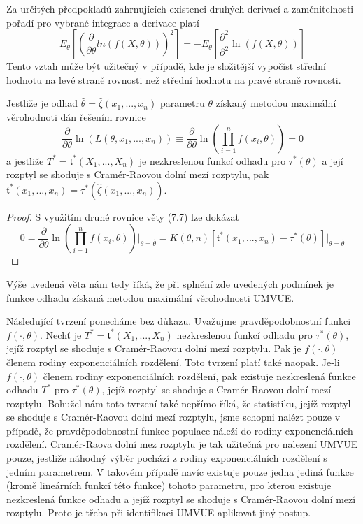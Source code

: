 Za určitých předpokladů zahrnujících existenci druhých derivací a zaměnitelnosti pořadí pro vybrané integrace a derivace platí
\begin{equation*}
E_{\theta}\left[\left(\frac{\partial}{\partial \theta} ln \left(f(X, \theta)\right)\right)^2\right] = - E_{\theta}\left[\frac{\partial^2}{\partial^2}\ln\left(f(X, \theta)\right)\right]
\end{equation*}
Tento vztah může být užitečný v případě, kde je složitější vypočíst střední hodnotu na levé straně rovnosti než střední hodnotu na pravé straně rovnosti.

\begin{theorem}
Jestliže je odhad $\hat{\theta} = \hat{\zeta}(x_1, ..., x_n)$ parametru $\theta$ získaný metodou maximální věrohodnoti dán řešením rovnice
\begin{equation*}
\frac{\partial}{\partial \theta}\ln\left(L(\theta, x_1, ..., x_n)\right) \equiv \frac{\partial}{\partial \theta}\ln \left(\prod_{i = 1}^n f(x_i, \theta) \right) = 0
\end{equation*}
a jestliže $T^* = \mathfrak{t}^*(X_1, ..., X_n)$ je nezkreslenou funkcí odhadu pro $\tau^*(\theta)$ a její rozptyl se shoduje s Cramér-Raovou dolní mezí rozptylu, pak $\mathfrak{t}^*(x_1, ..., x_n) = \tau^*(\hat{\zeta}(x_1, ..., x_n))$.
\end{theorem}

\begin{proof}
S využitím druhé rovnice věty (7.7) lze dokázat
\begin{equation*}
0 = \frac{\partial}{\partial \theta}\ln \left(\prod_{i = 1}^n f(x_i, \theta)\right)\Big|_{\theta = \hat{\theta}} = K(\theta, n)[\mathfrak{t}^*(x_1, ..., x_n) - \tau^*(\theta)]\Big|_{\theta = \hat{\theta}}
\end{equation*}
\end{proof}

Výše uvedená věta nám tedy říká, že při splnění zde uvedených podmínek je funkce odhadu získaná metodou maximální věrohodnosti UMVUE.

Následující tvrzení ponecháme bez důkazu. Uvažujme pravděpodobnostní funkci $f(\cdot, \theta)$. Nechť je $T^* = \mathfrak{t}^*(X_1, ..., X_n)$ nezkreslenou funkcí odhadu pro $\tau^*(\theta)$, jejíž rozptyl se shoduje s Cramér-Raovou dolní mezí rozptylu. Pak je $f(\cdot, \theta)$ členem rodiny exponenciálních rozdělení. Toto tvrzení platí také naopak. Je-li $f(\cdot, \theta)$ členem rodiny exponenciálních rozdělení, pak existuje nezkreslená funkce odhadu $T^*$ pro $\tau^*(\theta)$, jejíž rozptyl se shoduje s Cramér-Raovou dolní mezí rozptylu. Bohužel nám toto tvrzení také nepřímo říká, že statistiku, jejíž rozptyl se shoduje s Cramér-Raovou dolní mezí rozptylu, jsme schopni nalézt pouze v případě, že pravděpodobnostní funkce populace náleží do rodiny exponenciálních rozdělení. Cramér-Raova dolní mez rozptylu je tak užitečná pro nalezení UMVUE pouze, jestliže náhodný výběr pochází z rodiny exponenciálních rozdělení s jedním parametrem. V takovém případě navíc existuje pouze jedna jediná funkce (kromě lineárních funkcí této funkce) tohoto parametru, pro kterou existuje nezkreslená funkce odhadu a jejíž rozptyl se shoduje s Cramér-Raovou dolní mezí rozptylu. Proto je třeba při identifikaci UMVUE aplikovat jiný postup.

